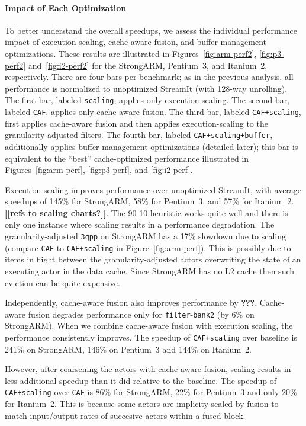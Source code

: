 \paragraph*{Impact of Each Optimization}
To better understand the overall speedups, we assess the individual
performance impact of execution scaling, cache aware fusion, and
buffer management optimizations.  These results are illustrated in
Figures~\ref{fig:arm-perf2}, \ref{fig:p3-perf2} and~\ref{fig:i2-perf2}
for the StrongARM, Pentium~3, and Itanium~2, respectively.  There are
four bars per benchmark; as in the previous analysis, all performance
is normalized to unoptimized StreamIt (with 128-way unrolling).  The
first bar, labeled {\tt scaling}, applies only execution scaling.  The
second bar, labeled {\tt CAF}, applies only cache-aware fusion.  The
third bar, labeled {\tt CAF+scaling}, first applies cache-aware fusion
and then applies execution-scaling to the granularity-adjusted
filters.  The fourth bar, labeled {\tt CAF+scaling+buffer},
additionally applies buffer management optimizations (detailed later);
this bar is equivalent to the ``best'' cache-optimized performance
illustrated in Figures~\ref{fig:arm-perf}, \ref{fig:p3-perf}, and
\ref{fig:i2-perf}.

Execution scaling improves performance over unoptimized StreamIt, with
average speedups of 145\% for StrongARM, 58\% for Pentium~3, and 57\%
for Itanium~2.  {\bf [[refs to scaling charts?]]}.  The 90-10
heuristic works quite well and there is only one instance where
scaling results in a performance degradation. The granularity-adjusted
\texttt{3gpp} on StrongARM has a 17\% slowdown due to scaling (compare
{\tt CAF} to {\tt CAF+scaling} in Figure~\ref{fig:arm-perf}).  This is
possibly due to items in flight between the granularity-adjusted
actors overwriting the state of an executing actor in the data cache.
Since StrongARM has no L2 cache then such eviction can be quite
expensive.

Independently, cache-aware fusion also improves performance by {\bf
???}.  Cache-aware fusion degrades performance only for
\texttt{filter}-\texttt{bank2} (by 6\% on StrongARM). When we combine
cache-aware fusion with execution scaling, the performance
consistently improves.  The speedup of \texttt{CAF+scaling} over
baseline is 241\% on StrongARM, 146\% on Pentium~3 and 144\% on
Itanium~2.

However, after coarsening the actors with cache-aware fusion, scaling
results in less additional speedup than it did relative to the
baseline.  The speedup of \texttt{CAF+scaling} over \texttt{CAF} is
86\% for StrongARM, 22\% for Pentium~3 and only 20\% for Itanium~2.
This is because some actors are implicity scaled by fusion to match
input/output rates of succesive actors within a fused block.

